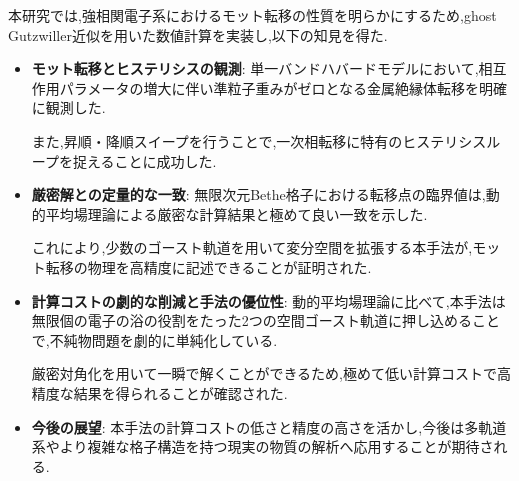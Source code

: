 本研究では,強相関電子系におけるモット転移の性質を明らかにするため,ghost Gutzwiller近似を用いた数値計算を実装し,以下の知見を得た.

\begin{itemize}
    \item \textbf{モット転移とヒステリシスの観測}:
    単一バンドハバードモデルにおいて,相互作用パラメータの増大に伴い準粒子重みがゼロとなる金属絶縁体転移を明確に観測した.

    また,昇順・降順スイープを行うことで,一次相転移に特有のヒステリシスループを捉えることに成功した.

    \item \textbf{厳密解との定量的な一致}:
    無限次元Bethe格子における転移点の臨界値は,動的平均場理論による厳密な計算結果と極めて良い一致を示した.

    これにより,少数のゴースト軌道を用いて変分空間を拡張する本手法が,モット転移の物理を高精度に記述できることが証明された.

    \item \textbf{計算コストの劇的な削減と手法の優位性}:
    動的平均場理論に比べて,本手法は無限個の電子の浴の役割をたった2つの空間ゴースト軌道に押し込めることで,不純物問題を劇的に単純化している.

    厳密対角化を用いて一瞬で解くことができるため,極めて低い計算コストで高精度な結果を得られることが確認された.

    \item \textbf{今後の展望}:
    本手法の計算コストの低さと精度の高さを活かし,今後は多軌道系やより複雑な格子構造を持つ現実の物質の解析へ応用することが期待される.
\end{itemize}